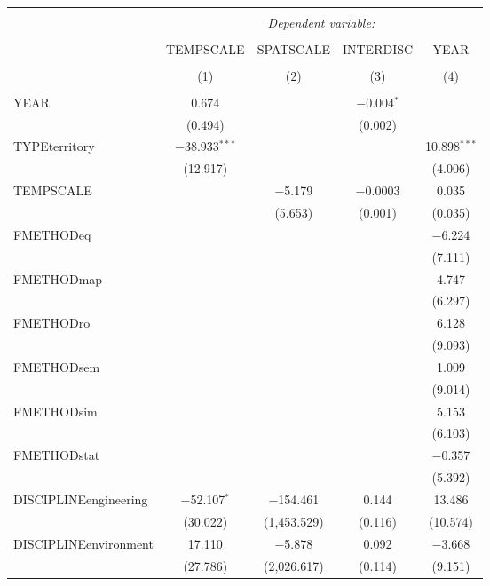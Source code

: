 
\begin{table}[!htbp] \centering 
  \caption{} 
  \label{} 
\begin{tabular}{@{\extracolsep{5pt}}lcccc} 
\\[-1.8ex]\hline 
\hline \\[-1.8ex] 
 & \multicolumn{4}{c}{\textit{Dependent variable:}} \\ 
\cline{2-5} 
\\[-1.8ex] & TEMPSCALE & SPATSCALE & INTERDISC & YEAR \\ 
\\[-1.8ex] & (1) & (2) & (3) & (4)\\ 
\hline \\[-1.8ex] 
 YEAR & 0.674 &  & $-$0.004$^{*}$ &  \\ 
  & (0.494) &  & (0.002) &  \\ 
  TYPEterritory & $-$38.933$^{***}$ &  &  & 10.898$^{***}$ \\ 
  & (12.917) &  &  & (4.006) \\ 
  TEMPSCALE &  & $-$5.179 & $-$0.0003 & 0.035 \\ 
  &  & (5.653) & (0.001) & (0.035) \\ 
  FMETHODeq &  &  &  & $-$6.224 \\ 
  &  &  &  & (7.111) \\ 
  FMETHODmap &  &  &  & 4.747 \\ 
  &  &  &  & (6.297) \\ 
  FMETHODro &  &  &  & 6.128 \\ 
  &  &  &  & (9.093) \\ 
  FMETHODsem &  &  &  & 1.009 \\ 
  &  &  &  & (9.014) \\ 
  FMETHODsim &  &  &  & 5.153 \\ 
  &  &  &  & (6.103) \\ 
  FMETHODstat &  &  &  & $-$0.357 \\ 
  &  &  &  & (5.392) \\ 
  DISCIPLINEengineering & $-$52.107$^{*}$ & $-$154.461 & 0.144 & 13.486 \\ 
  & (30.022) & (1,453.529) & (0.116) & (10.574) \\ 
  DISCIPLINEenvironment & 17.110 & $-$5.878 & 0.092 & $-$3.668 \\ 
  & (27.786) & (2,026.617) & (0.114) & (9.151) \\ 

\end{tabular}
\end{table}
